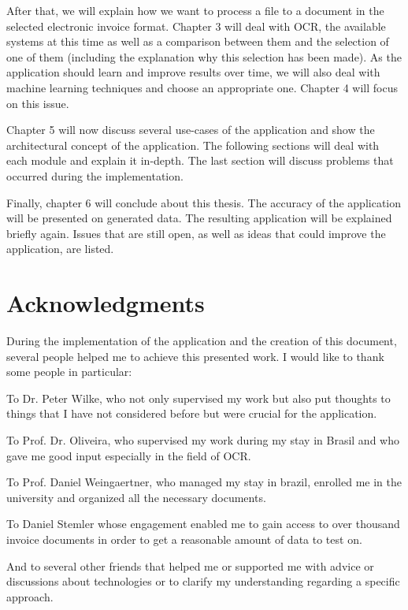 After that, we will explain how we want to process a file to a document in the selected electronic invoice format. Chapter 3 will deal with OCR, the available systems at this time as well as a comparison between them and the selection of one of them (including the explanation why this selection has been made).
As the application should learn and improve results over time, we will also deal with machine learning techniques and choose an appropriate one. Chapter 4 will focus on this issue.

Chapter 5 will now discuss several use-cases of the application and show the architectural concept of the application. The following sections will deal with each module and explain it in-depth. The last section will discuss problems that occurred during the implementation.

Finally, chapter 6 will conclude about this thesis. The accuracy of the application will be presented on generated data. The resulting application will be explained briefly again. Issues that are still open, as well as ideas that could improve the application, are listed.

\section{Acknowledgments}
\label{sec1.7}

During the implementation of the application and the creation of this document, several people helped me to achieve this presented work. I would like to thank some people in particular:

To Dr. Peter Wilke, who not only supervised my work but also put thoughts to things that I have not considered before but were crucial for the application.

To Prof. Dr. Oliveira, who supervised my work during my stay in Brasil and who gave me good input especially in the field of OCR.

To Prof. Daniel Weingaertner, who managed my stay in brazil, enrolled me in the university and organized all the necessary documents.

To Daniel Stemler whose engagement enabled me to gain access to over thousand invoice documents in order to get a reasonable amount of data to test on.

And to several other friends that helped me or supported me with advice or discussions about technologies or to clarify my understanding regarding a specific approach.